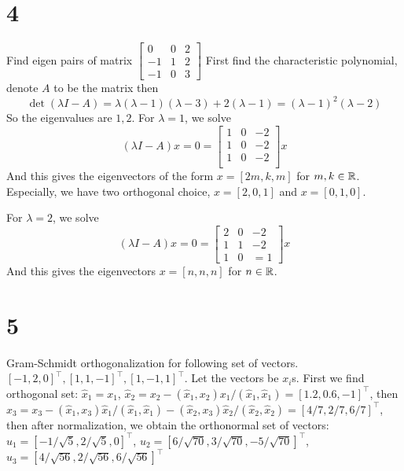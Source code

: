 \documentclass{article}
\begin{document}
\section*{4}
\begin{myleftlinebox}
    Find eigen pairs of matrix \(\begin{bmatrix}
        0 & 0 & 2\\
        -1 & 1 & 2\\
        -1 & 0 & 3
    \end{bmatrix}\)
    \tcblower
    First find the characteristic polynomial, denote \(A\) to be the matrix then
    \[\det(\lambda I - A) = \lambda(\lambda-1)(\lambda-3)+2(\lambda-1) = (\lambda-1)^2(\lambda-2)\]
    So the eigenvalues are \(1,2\). For \(\lambda=1\), we solve
    \[(\lambda I - A)x = 0 = \begin{bmatrix}
        1 & 0 & -2 \\
        1 & 0 & -2 \\
        1 & 0 & -2 \\
    \end{bmatrix}x\]
    And this gives the eigenvectors of the form \(x=[2m,k,m]\) for \(m,k \in \mathbb{R}\). Especially, we have two orthogonal choice, \(x=[2,0,1]\) and \(x = [0,1,0]\).

    For \(\lambda=2\), we solve
    \[(\lambda I - A)x = 0 = \begin{bmatrix}
        2 & 0 & -2\\
        1 & 1 & -2\\
        1 & 0 & =1
    \end{bmatrix}x\]
    And this gives the eigenvectors \(x = [n,n,n]\) for \(n\in \mathbb{R}\).

\end{myleftlinebox}

\section*{5}
\begin{myleftlinebox}
    Gram-Schmidt orthogonalization for following set of vectors. \([-1,2,0]^\top, [1,1,-1]^\top,[1,-1,1]^\top \).
    \tcblower
    Let the vectors be \(x_i\)s. First we find orthogonal set: \(\hat x_1 = x_1\), \(\hat x_2 = x_2 - (\hat x_1,x_2)x_1/(\hat x_1,\hat x_1) = [1.2,0.6,-1]^\top\), then \(\hat x_3 = x_3 - (\hat x_1,x_3)\hat x_1/(\hat x_1,\hat x_1) - (\hat x_2,x_3)\hat x_2/(\hat x_2,\hat x_2) = [4/7,2/7,6/7]^\top\), then after normalization, we obtain the orthonormal set of vectors: \(u_1 = [-1/\sqrt 5,2/\sqrt 5,0]^\top\), \(u_2 = [6/\sqrt{70},3/\sqrt{70},-5/\sqrt{70}]^\top\), \(u_3 = [4/\sqrt{56},2/\sqrt{56},6/\sqrt{56}]^\top\)
\end{myleftlinebox}
\end{document}
